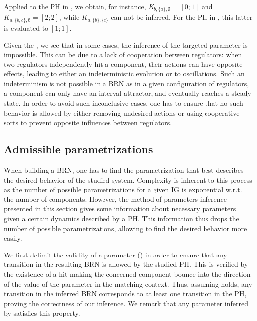\begin{example*}
Applied to the PH in , we obtain, for instance, 
$K_{b,\{a\},\emptyset} = [0 ; 1]$ and
$K_{a,\{b,c\},\emptyset} = [2 ; 2]$,
while $K_{a,\{b\},\{c\}}$ can not be inferred.
For the PH in , this latter is evaluated to $[1;1]$.
\end{example*}

Given the , we see that in some cases, the inference of the targeted parameter is impossible.
This can be due to a lack of cooperation between regulators: when two regulators independently hit a component, their actions can have opposite effects, leading to either an indeterministic evolution or to oscillations.
Such an indeterminism is not possible in a BRN as in a given configuration of regulators, a component can only have an interval attractor, and eventually reaches a steady-state.
In order to avoid such inconclusive cases, one has to ensure that no such behavior is allowed by
either removing undesired actions or using cooperative sorts to prevent opposite influences between
regulators.

\subsection{Admissible parametrizations}\label{ssec:admissible-K}

When building a BRN, one has to find the parametrization that best describes the desired behavior of the studied system.
Complexity is inherent to this process as the number of possible parametrizations for a given IG is exponential w.r.t. the number of components.
However, the method of parameters inference presented in this section gives some information about necessary parameters given a certain dynamics described by a PH.
This information thus drops the number of possible parametrizations, allowing to find the desired behavior more easily.

We first delimit the validity of a parameter () in order to ensure that any
transition in the resulting BRN is allowed by the studied PH.
This is verified by the existence of a hit making the concerned component bounce into the direction
of the value of the parameter in the matching context.
Thus, assuming  holds, any transition in the inferred BRN corresponds to at least
one transition in the PH, proving the correctness of our inference.
We remark that any parameter inferred by  satisfies this property.

